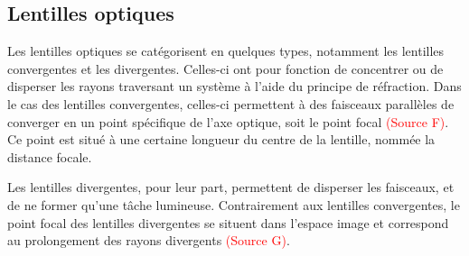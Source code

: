\documentclass[11pt,letterpaper]{article}
\begin{document}


\subsection{Lentilles optiques}
Les lentilles optiques se catégorisent en quelques types, notamment les lentilles convergentes et les divergentes. Celles-ci ont pour fonction de concentrer ou de disperser les rayons traversant un système à l'aide du principe de réfraction. Dans le cas des lentilles convergentes, celles-ci permettent à des faisceaux parallèles de converger en un point spécifique de l'axe optique, soit le point focal \textcolor{red}{(Source F)}. Ce point est situé à une certaine longueur du centre de la lentille, nommée la distance focale. 

Les lentilles divergentes, pour leur part, permettent de disperser les faisceaux, et de ne former qu'une tâche lumineuse. Contrairement aux lentilles convergentes, le point focal des lentilles divergentes se situent dans l'espace image et correspond au prolongement des rayons divergents \textcolor{red}{(Source G)}. 

\end{document}
